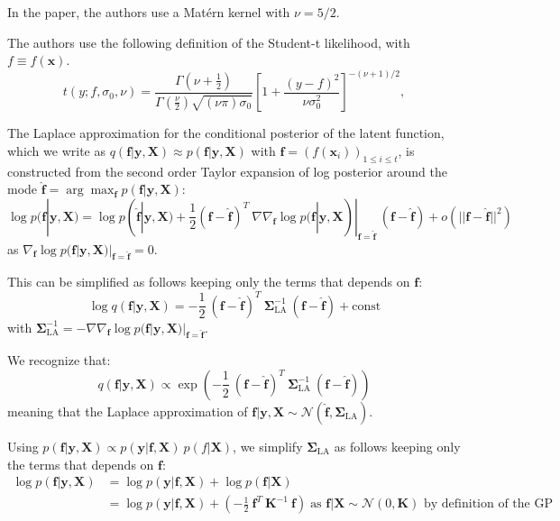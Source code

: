 \documentclass{article}
\newcommand{\mbs}[1]{\ensuremath{\boldsymbol{#1}}}
\newcommand{\x}{\mathbf{x}}
\newcommand{\y}{\mathbf{y}}
\newcommand{\f}{\mathbf{f}}
\newcommand{\K}{\mathbf{K}}
\newcommand{\X}{\mathbf{X}}
\newcommand{\Sigmab}{\mbs{\Sigma}}
\begin{document}
In the paper, the authors use a Mat\'ern kernel with $\nu = 5/2$.

The authors use the following definition of the Student-t likelihood, with $f \equiv f(\x)$.
\begin{equation}
	\label{eq:likt}
	t(y;f,\sigma_0,\nu) = \frac{\Gamma\left(\nu + \frac{1}{2}\right)}{\Gamma(\frac{\nu}{2}) \sqrt{(\nu\pi)\sigma_0}}\left[1+\frac{(y-f)^2}{\nu\sigma_0^2}\right]^{-(\nu + 1) / 2},
\end{equation}

The Laplace approximation for the conditional posterior of the latent function, which we write as $q(\f | \y, \X) \approx p(\f | \y, \X)$ with $\f = \left( f (\x_i) \right)_{1 \leq i \leq t}$, is constructed from the second order Taylor expansion of log posterior around the mode $\hat{\f} = \arg\max_\f p(\f | \y, \X)$:
\begin{equation*}
  \log p(\f | \y, \X) = \log p(\hat{\f} | \y, \X)
    + \frac{1}{2} (\f - \hat{\f})^T \ \nabla \nabla_\f \log p(\f | \y, \X) |_{\f = \hat{\f}} \ (\f - \hat{\f}) + o(||\f - \hat{\f}||^2)
\end{equation*}
as $\nabla_\f \log p(\f | \y, \X) |_{\f = \hat{\f}} = 0$.

This can be simplified as follows keeping only the terms that depends on $\f$:
\begin{equation*}
  \log q(\f | \y, \X) = - \frac{1}{2} \ (\f - \hat{\f})^T \ \Sigmab_{\text{LA}}^{-1} \ (\f - \hat{\f}) + \text{const}
\end{equation*}
with $\Sigmab_{\text{LA}}^{-1} = - \nabla \nabla_\f \log p(\f | \y, \X) |_{\f = \hat{\f}}$.

We recognize that:
\begin{equation*}
  q(\f | \y, \X) \propto \exp \left( - \frac{1}{2} \ (\f - \hat{\f})^T \ \Sigmab_{\text{LA}}^{-1} \ (\f - \hat{\f}) \right)
\end{equation*}
meaning that the Laplace approximation of $\f | \y, \X \sim \mathcal{N}(\hat{\f}, \Sigmab_{\text{LA}})$.

Using $p(\f | \y, \X) \propto p(\y | \f, \X) \ p(f | \X)$, we simplify $\Sigmab_{\text{LA}}$ as follows keeping only the terms that depends on $\f$:
\begin{align*}
  \log p(\f | \y, \X) &= \log p(\y | \f, \X) + \log p(\f | \X) \\
  &= \log p(\y | \f, \X) + \left( - \frac{1}{2} \ \f^T \ \K^{-1} \ \f \right) \; \text{as $\f | \X \sim \mathcal{N}(0, \K)$ by definition of the GP}\\
\end{align*}
\end{document}
